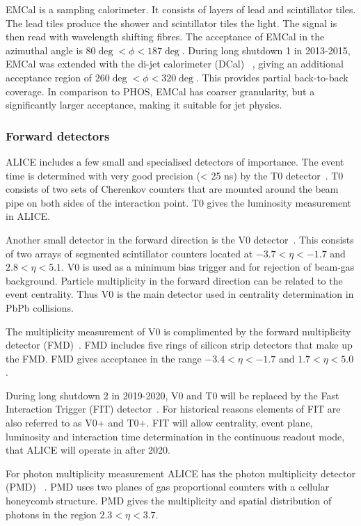 EMCal is a sampling calorimeter. It consists of layers of lead and scintillator tiles. The lead tiles produce the shower and scintillator tiles the light. The signal is then read with wavelength shifting fibres. The acceptance of EMCal in the azimuthal angle is $ 80\deg < \phi < 187 \deg$. During long shutdown 1 in 2013-2015, EMCal was extended with the di-jet calorimeter (DCal) ~\cite{dcal}, giving an additional acceptance region of $ 260\deg < \phi < 320 \deg$. This provides partial back-to-back coverage. In comparison to PHOS, EMCal has coarser granularity, but a significantly larger acceptance, making it suitable for jet physics.

\subsubsection{Forward detectors}
ALICE includes a few small and specialised detectors of importance. The event time is determined with very good precision (< 25 ns) by the T0 detector~\cite{T0}. T0 consists of two sets of Cherenkov counters that are mounted around the beam pipe on both sides of the interaction point. T0 gives the luminosity measurement in ALICE.

Another small detector in the forward direction is the V0 detector~\cite{V0}. This consists of two arrays of segmented scintillator counters located at $-3.7 < \eta < -1.7$ and $ 2.8 < \eta < 5.1$. V0 is used as a minimum bias trigger and for rejection of beam-gas background. Particle multiplicity in the forward direction can be related to the event centrality. Thus V0 is the main detector used in centrality determination in PbPb collisions.

The multiplicity measurement of V0 is complimented by the forward multiplicity detector (FMD)~\cite{FMD}. FMD includes five rings of silicon strip detectors that make up the FMD. FMD gives acceptance in the range $-3.4 < \eta < -1.7$ and $ 1.7 < \eta < 5.0$.

During long shutdown 2 in 2019-2020, V0 and T0 will be replaced by the Fast Interaction Trigger (FIT) detector~\cite{FIT}. For historical reasons elements of FIT are also referred to as V0+ and T0+. FIT will allow centrality, event plane, luminosity and interaction time determination in the continuous readout mode, that ALICE will operate in after 2020.

For photon multiplicity measurement ALICE has the photon multiplicity detector (PMD) ~\cite{PMD}. PMD uses two planes of gas proportional counters with a cellular honeycomb structure. PMD gives the multiplicity and spatial distribution of photons in the region $2.3 < \eta < 3.7$.

